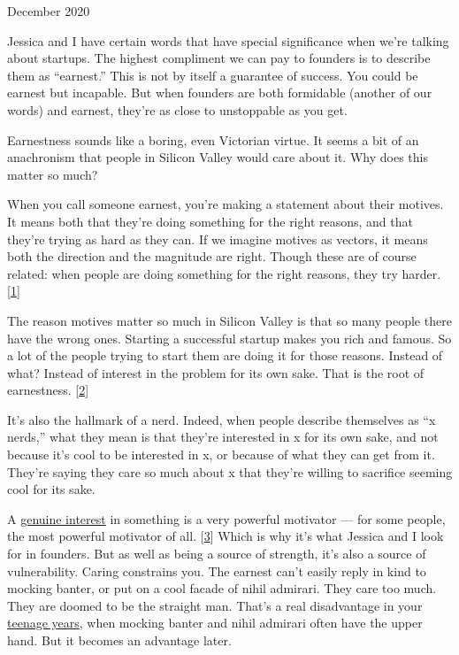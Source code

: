 December 2020

Jessica and I have certain words that have special significance when
we're talking about startups. The highest compliment we can pay to
founders is to describe them as ``earnest.'' This is not by itself a
guarantee of success. You could be earnest but incapable. But when
founders are both formidable (another of our words) and earnest, they're
as close to unstoppable as you get.

Earnestness sounds like a boring, even Victorian virtue. It seems a bit
of an anachronism that people in Silicon Valley would care about it. Why
does this matter so much?

When you call someone earnest, you're making a statement about their
motives. It means both that they're doing something for the right
reasons, and that they're trying as hard as they can. If we imagine
motives as vectors, it means both the direction and the magnitude are
right. Though these are of course related: when people are doing
something for the right reasons, they try harder.
{[}\hyperref[f1n]{1}{]}

The reason motives matter so much in Silicon Valley is that so many
people there have the wrong ones. Starting a successful startup makes
you rich and famous. So a lot of the people trying to start them are
doing it for those reasons. Instead of what? Instead of interest in the
problem for its own sake. That is the root of earnestness.
{[}\hyperref[f2n]{2}{]}

It's also the hallmark of a nerd. Indeed, when people describe
themselves as ``x nerds,'' what they mean is that they're interested in
x for its own sake, and not because it's cool to be interested in x, or
because of what they can get from it. They're saying they care so much
about x that they're willing to sacrifice seeming cool for its sake.

A \href{genius.html}{genuine interest} in something is a very powerful
motivator --- for some people, the most powerful motivator of all.
{[}\hyperref[f3n]{3}{]} Which is why it's what Jessica and I look for in
founders. But as well as being a source of strength, it's also a source
of vulnerability. Caring constrains you. The earnest can't easily reply
in kind to mocking banter, or put on a cool facade of nihil admirari.
They care too much. They are doomed to be the straight man. That's a
real disadvantage in your \href{nerds.html}{teenage years}, when mocking
banter and nihil admirari often have the upper hand. But it becomes an
advantage later.

